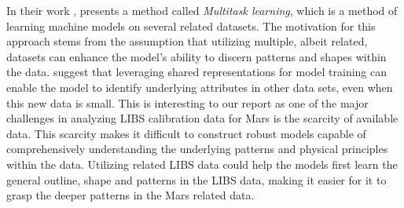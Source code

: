 In their work \citet{caruana_no_1997}, presents a method called \textit{Multitask learning}, which is a method of learning machine models on several related datasets. 
The motivation for this approach stems from the assumption that utilizing multiple, albeit related, datasets can enhance the model's ability to discern patterns and shapes within the data.
\citet{caruana_no_1997} suggest that leveraging shared representations for model training can enable the model to identify underlying attributes in other data sets, even when this new data is small.
This is interesting to our report as one of the major challenges in analyzing LIBS calibration data for Mars is the scarcity of available data.
This scarcity makes it difficult to construct robust models capable of comprehensively understanding the underlying patterns and physical principles within the data.
Utilizing related LIBS data could help the models first learn the general outline, shape and patterns in the LIBS data, making it easier for it to grasp the deeper patterns in the Mars related data.


